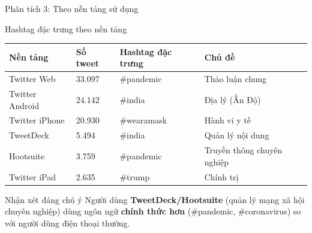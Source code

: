 \documentclass[aspectratio=169]{beamer}
\begin{document}
\begin{frame}{Phân tích 3: Theo nền tảng sử dụng}
  \begin{block}{Hashtag đặc trưng theo nền tảng}
    \centering
    \begin{tabular}{llll}
      \toprule
      \textbf{Nền tảng} & \textbf{Số tweet} & \textbf{Hashtag đặc trưng} & \textbf{Chủ đề} \\
      \midrule
      Twitter Web    & 33.097 & \#pandemic       & Thảo luận chung \\
      Twitter Android & 24.142 & \#india          & Địa lý (Ấn Độ) \\
      Twitter iPhone & 20.930 & \#wearamask       & Hành vi y tế \\
      TweetDeck      & 5.494  & \#india           & Quản lý nội dung \\
      Hootsuite      & 3.759  & \#pandemic        & Truyền thông chuyên nghiệp \\
      Twitter iPad   & 2.635  & \#trump           & Chính trị \\
      \bottomrule
    \end{tabular}
  \end{block}

  \vspace{0.3em}
  \begin{alertblock}{Nhận xét đáng chú ý}
    Người dùng \textbf{TweetDeck/Hootsuite} (quản lý mạng xã hội chuyên nghiệp) dùng ngôn ngữ \textbf{chính thức hơn} (\#pandemic, \#coronavirus) so với người dùng điện thoại thường.
  \end{alertblock}
\end{frame}
\end{document}
